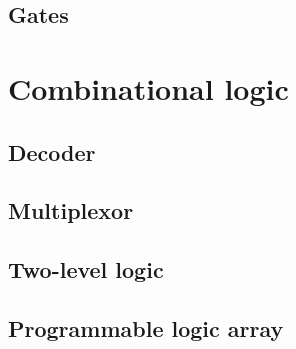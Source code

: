         \subsection{Gates}
        
    \section{Combinational logic}\label{section:Combinational_logic}
        
        \subsection{Decoder}
        
        \subsection{Multiplexor}
        
        \subsection{Two-level logic}
        
        \subsection{Programmable logic array}